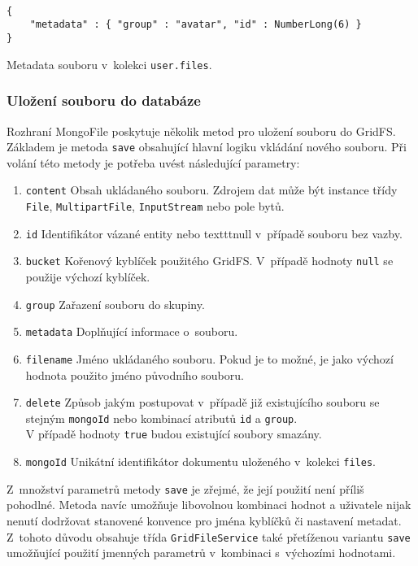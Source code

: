 \begin{example}
    \centering
    \begin{lstlisting}

{
    "metadata" : { "group" : "avatar", "id" : NumberLong(6) }
}
    \end{lstlisting}
    \caption{Metadata souboru v~kolekci \texttt{user.files}.}
\end{example}


\subsubsection{\textbf{Uložení souboru do databáze}}
Rozhraní MongoFile poskytuje několik metod pro uložení souboru do GridFS. Základem je metoda \texttt{save} obsahující hlavní logiku vkládání nového souboru. Při volání této metody je potřeba uvést následující parametry:
\begin{enumerate}
\item \texttt{content}
Obsah ukládaného souboru. Zdrojem dat může být instance třídy \texttt{File}, \texttt{MultipartFile}, \texttt{InputStream} nebo pole bytů.
\item \texttt{id}
Identifikátor vázané entity nebo texttt{null} v~případě souboru bez vazby.
\item \texttt{bucket}
Kořenový kyblíček použitého GridFS. V~případě hodnoty \texttt{null} se použije výchozí kyblíček.
\item \texttt{group}
Zařazení souboru do skupiny.
\item \texttt{metadata}
Doplňující informace o~souboru.
\item \texttt{filename}
Jméno ukládaného souboru. Pokud je to možné, je jako výchozí hodnota použito jméno původního souboru.
\item \texttt{delete}
Způsob jakým postupovat v~případě již existujícího souboru se stejným \texttt{mongoId} nebo kombinací atributů \texttt{id} a \texttt{group}.
\\V případě hodnoty \texttt{true} budou existující soubory smazány.
\item \texttt{mongoId}
Unikátní identifikátor dokumentu uloženého v~kolekci \texttt{files}.
\end{enumerate}
Z~množství parametrů metody \texttt{save} je zřejmé, že její použití není příliš pohodlné. Metoda navíc umožňuje libovolnou kombinaci hodnot a uživatele nijak nenutí dodržovat stanovené konvence pro jména kyblíčků či nastavení metadat. Z~tohoto důvodu obsahuje třída \texttt{GridFileService} také přetíženou variantu \texttt{save} umožňující použití jmenných parametrů v~kombinaci s~výchozími hodnotami.

